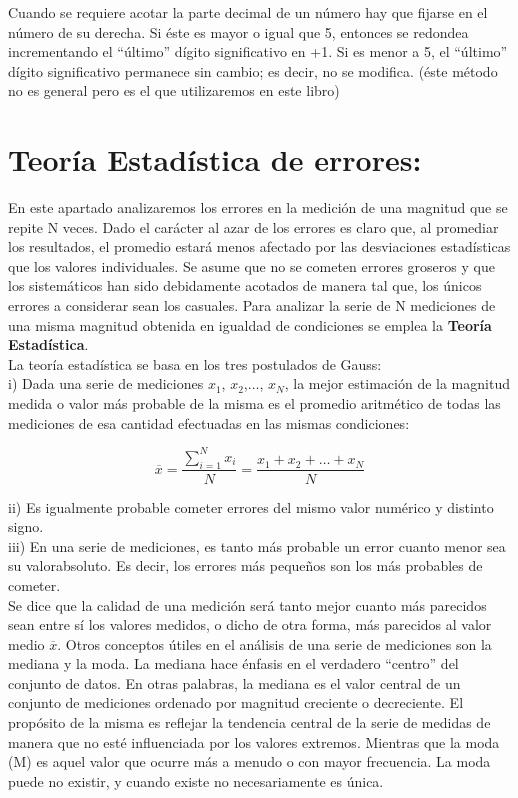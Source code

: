 Cuando  se  requiere  acotar  la  parte  decimal  de  un  número  hay  que  fijarse  en  el  número  de  su derecha. Si  éste  es 
 mayor o igual que  5,  entonces  se  redondea  incrementando  el  “último”  dígito significativo en +1.  Si es menor a 5, el 
``último'' dígito significativo permanece sin cambio; es decir, no se modifica. (éste método no es general pero es el que 
utilizaremos en este libro)

\section{Teoría Estadística de errores:}


En este apartado analizaremos los errores en la medición de una magnitud que se repite N veces.  Dado el carácter al azar de los 
errores es claro que, al promediar  los  resultados,  el  promedio  estará  menos  afectado  por  las  desviaciones estadísticas 
 que los valores individuales.  Se asume que no se cometen errores groseros y que los sistemáticos han sido debidamente acotados 
de manera tal que, los únicos errores a considerar sean los casuales. Para  analizar  la  serie  de N  mediciones  de  una  misma 
 magnitud  obtenida  en  igualdad  de condiciones  se  emplea  la  \textbf{Teoría  Estadística}.\\
 
La teoría estadística se basa en los tres postulados de Gauss:\\

i) Dada una serie de mediciones $x_1$, $x_2$,$\ldots$, $x_N$, la 
mejor estimación de la magnitud medida o valor más probable de la misma es el promedio aritmético de todas las mediciones de esa 
cantidad efectuadas en las mismas condiciones:

\begin{equation}
 \overline{x} = \frac{\sum_{i = 1}^{N} x_i}{N} = \frac{x_1+x_2+\ldots + x_N}{N}
\end{equation}

ii) Es igualmente probable cometer errores del mismo valor numérico y distinto signo.\\

iii) En  una  serie  de  mediciones, es tanto más probable un error cuanto menor sea su valorabsoluto. Es decir, los errores más 
pequeños son los más probables de cometer.\\

Se dice que la calidad de una medición será tanto mejor cuanto más parecidos sean entre sí los valores medidos, o dicho de otra 
forma, más parecidos al valor medio $\overline{x}$. Otros conceptos útiles en el análisis de una serie de mediciones son la 
mediana y la moda. La mediana hace énfasis en el verdadero ``centro'' del conjunto de datos. En otras palabras, la mediana es el 
valor central de un conjunto de mediciones ordenado por magnitud creciente o decreciente.  El  propósito  de  la  misma  es  
reflejar  la  tendencia  central  de  la  serie  de  medidas  de  manera  que  no esté  influenciada  por  los  valores  
extremos. Mientras  que  la moda (M)  es  aquel  valor  que  ocurre más  a  menudo  o  con  mayor  frecuencia. La moda puede 
no existir, y cuando existe no necesariamente es única.
 
